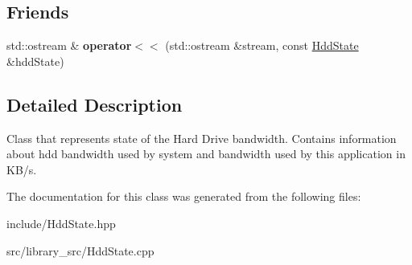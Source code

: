 \subsection*{Friends}
\begin{DoxyCompactItemize}
\item 
std\+::ostream \& {\bfseries operator$<$$<$} (std\+::ostream \&stream, const \hyperlink{classHddState}{Hdd\+State} \&hdd\+State)\hypertarget{classHddState_ad35130e1f8c87b1677682142a1656d8c}{}\label{classHddState_ad35130e1f8c87b1677682142a1656d8c}

\end{DoxyCompactItemize}


\subsection{Detailed Description}
Class that represents state of the Hard Drive bandwidth. Contains information about hdd bandwidth used by system and bandwidth used by this application in K\+B/s. 

The documentation for this class was generated from the following files\+:\begin{DoxyCompactItemize}
\item 
include/Hdd\+State.\+hpp\item 
src/library\+\_\+src/Hdd\+State.\+cpp\end{DoxyCompactItemize}
